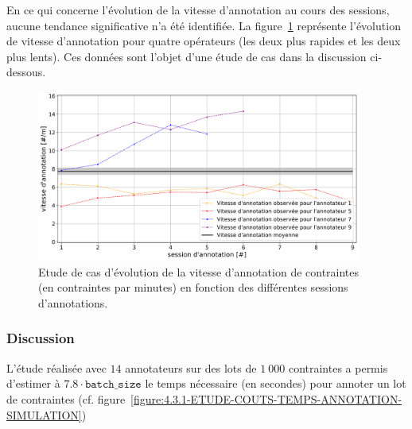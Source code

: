			En ce qui concerne l'évolution de la vitesse d'annotation au cours des sessions, aucune tendance significative n'a été identifiée. 
			La figure~\ref{figure:4.3.1-ETUDE-COUTS-TEMPS-ANNOTATION-EXEMPLE} représente l'évolution de vitesse d'annotation pour quatre opérateurs (les deux plus rapides et les deux plus lents).
			Ces données sont l'objet d'une étude de cas dans la discussion ci-dessous.
			\begin{figure}[!htb]
				\centering
				\includegraphics[width=0.95\textwidth]{figures/etude-temps-annotation-3-etude-de-cas}
				\caption{Etude de cas d'évolution de la vitesse d'annotation de contraintes (en contraintes par minutes) en fonction des différentes sessions d'annotations.}
				\label{figure:4.3.1-ETUDE-COUTS-TEMPS-ANNOTATION-EXEMPLE}
			\end{figure}

		\subsubsection{Discussion}

		
		L'étude réalisée avec $14$ annotateurs sur des lots de $1~000$ contraintes a permis d'estimer à $7.8 \cdot \texttt{batch\_size}$ le temps nécessaire (en secondes) pour annoter un lot de contraintes (cf. figure~\ref{figure:4.3.1-ETUDE-COUTS-TEMPS-ANNOTATION-SIMULATION})
		
